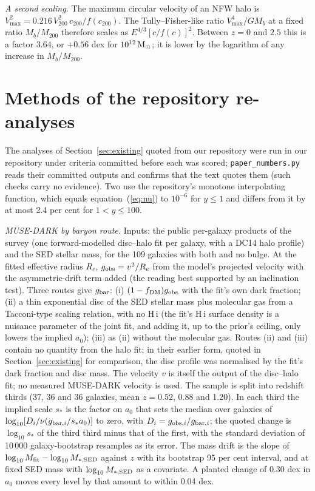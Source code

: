 \documentclass[fleqn,usenatbib]{mnras}
\begin{document}
\emph{A second scaling.} The maximum circular velocity of an NFW halo is $V_{\max}^2=0.216\,V_{200}^2\,c_{200}/f(c_{200})$. The Tully--Fisher-like ratio $V_{\max}^4/GM_b$ at a fixed ratio $M_b/M_{200}$ therefore scales as $E^{4/3}[c/f(c)]^2$. Between $z=0$ and $2.5$ this is a factor $3.64$, or $+0.56$ dex for $10^{12}\,{\rm M_\odot}$; it is lower by the logarithm of any increase in $M_b/M_{200}$.

\section{Methods of the repository re-analyses}
\label{app:methods}
The analyses of Section~\ref{sec:existing} quoted from our repository were run in our repository under criteria committed before each was scored; \texttt{paper\_numbers.py} reads their committed outputs and confirms that the text quotes them (such checks carry no evidence). Two use the repository's monotone interpolating function, which equals equation~(\ref{eq:nu}) to $10^{-6}$ for $y\leq1$ and differs from it by at most 2.4 per cent for $1<y\leq100$.

\emph{MUSE-DARK by baryon route.} Inputs: the public per-galaxy products of the survey (one forward-modelled disc--halo fit per galaxy, with a DC14 halo profile) and the SED stellar mass, for the 109 galaxies with both and no bulge. At the fitted effective radius $R_e$, $g_{\rm obs}=v^2/R_e$ from the model's projected velocity with the asymmetric-drift term added (the reading best supported by an inclination test). Three routes give $g_{\rm bar}$: (i) $(1-f_{\rm DM})g_{\rm obs}$ with the fit's own dark fraction; (ii) a thin exponential disc of the SED stellar mass plus molecular gas from a Tacconi-type scaling relation, with no H\,{\sc i} (the fit's H\,{\sc i} surface density is a nuisance parameter of the joint fit, and adding it, up to the prior's ceiling, only lowers the implied $a_0$); (iii) as (ii) without the molecular gas. Routes (ii) and (iii) contain no quantity from the halo fit; in their earlier form, quoted in Section~\ref{sec:existing} for comparison, the disc profile was normalised by the fit's dark fraction and disc mass. The velocity $v$ is itself the output of the disc--halo fit; no measured MUSE-DARK velocity is used. The sample is split into redshift thirds (37, 36 and 36 galaxies, mean $z=0.52$, 0.88 and 1.20). In each third the implied scale $s_*$ is the factor on $a_0$ that sets the median over galaxies of $\log_{10}[D_i/\nu(g_{{\rm bar},i}/s_*a_0)]$ to zero, with $D_i=g_{{\rm obs},i}/g_{{\rm bar},i}$; the quoted change is $\log_{10}s_*$ of the third third minus that of the first, with the standard deviation of 10\,000 galaxy-bootstrap resamples as its error. The mass drift is the slope of $\log_{10}M_{\rm fit}-\log_{10}M_{*,\rm SED}$ against $z$ with its bootstrap 95 per cent interval, and at fixed SED mass with $\log_{10}M_{*,\rm SED}$ as a covariate. A planted change of 0.30 dex in $a_0$ moves every level by that amount to within 0.04 dex.
\end{document}
